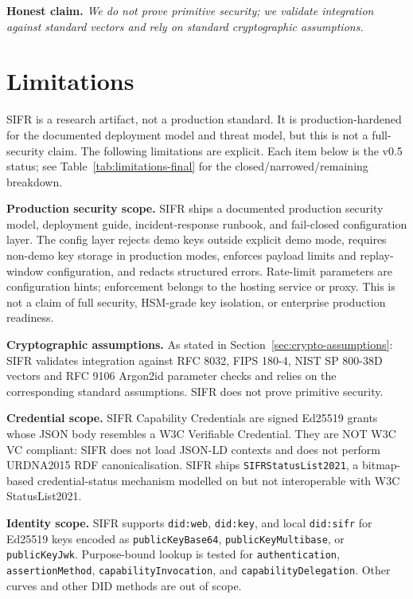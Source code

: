 \documentclass[runningheads]{llncs}
\begin{document}
\noindent
\textbf{Honest claim.} \emph{We do not prove primitive security; we
validate integration against standard vectors and rely on standard
cryptographic assumptions.}

\section{Limitations}

SIFR is a research artifact, not a production standard. It is
production-hardened for the documented deployment model and threat model,
but this is not a full-security claim. The following limitations are explicit.
Each item below is the v0.5 status; see
Table~\ref{tab:limitations-final} for the closed/narrowed/remaining
breakdown.

\textbf{Production security scope.} SIFR ships a documented production
security model, deployment guide, incident-response runbook, and
fail-closed configuration layer. The config layer rejects demo keys outside
explicit demo mode, requires non-demo key storage in production modes,
enforces payload limits and replay-window configuration, and redacts
structured errors. Rate-limit parameters are configuration hints; enforcement
belongs to the hosting service or proxy. This is not a claim of full
security, HSM-grade key isolation, or enterprise production readiness.

\textbf{Cryptographic assumptions.} As stated in
Section~\ref{sec:crypto-assumptions}: SIFR validates integration against
RFC 8032, FIPS 180-4, NIST SP 800-38D vectors and RFC 9106 Argon2id
parameter checks and relies on the corresponding standard assumptions.
SIFR does not prove primitive security.

\textbf{Credential scope.} SIFR Capability Credentials are signed
Ed25519 grants whose JSON body resembles a W3C Verifiable Credential.
They are NOT W3C VC compliant: SIFR does not load JSON-LD contexts and
does not perform URDNA2015 RDF canonicalisation. SIFR ships
\texttt{SIFRStatusList2021}, a bitmap-based credential-status mechanism
modelled on but not interoperable with W3C StatusList2021.

\textbf{Identity scope.} SIFR supports \texttt{did:web}, \texttt{did:key},
and local \texttt{did:sifr} for Ed25519 keys encoded as
\texttt{publicKeyBase64}, \texttt{publicKeyMultibase}, or
\texttt{publicKeyJwk}. Purpose-bound lookup is tested for
\texttt{authentication}, \texttt{assertionMethod},
\texttt{capabilityInvocation}, and \texttt{capabilityDelegation}. Other curves and other DID methods are out of
scope.
\end{document}
